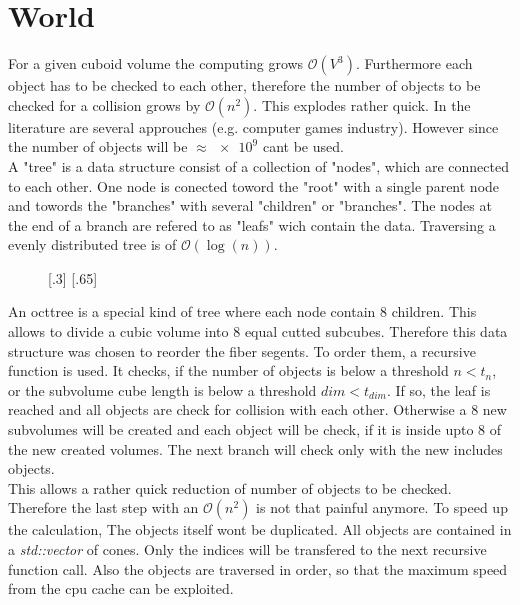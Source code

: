 \section{World}
For a given cuboid volume the computing grows $\mathcal{O}(V^3)$.
Furthermore each object has to be checked to each other, therefore the number of objects to be checked for a collision grows by $\mathcal{O}(n^2)$.
This explodes rather quick.
In the literature are several approuches (e.g. computer games industry).
However since the number of objects will be $\approx \num{e9}$ \dummy cant be used. \\
% 
A "tree" is a data structure consist of a collection of "nodes", which are connected to each other.
One node is conected toword the "root" with a single parent node and towords the "branches" with several "children" or "branches".
The nodes at the end of a branch are refered to as "leafs" wich contain the data.
Traversing a  evenly distributed tree is of $\mathcal{O}(\log(n))$.\\
% 
\begin{figure}[!t]
    \centering
    [.3\textwidth]{
    \def\tikzheight{0.6\textwidth}
    }
    [.65\textwidth]{
    \def\tikzheight{0.6\textwidth}
    }
	\caption{}
	\label{fig:oct_tree}
\end{figure}
% 
An octtree is a special kind of tree where each node contain 8 children.
This allows to divide a cubic volume into 8 equal cutted subcubes.
Therefore this data structure was chosen to reorder the fiber segents.
To order them, a recursive function is used.
It checks, if the number of objects is below a threshold $n < t_n$, or the subvolume cube length is below a threshold $dim < t_{dim}$.
If so, the leaf is reached and all objects are check for collision with each other.
Otherwise a 8 new subvolumes will be created and each object will be check, if it is inside upto 8 of the new created volumes.
The next branch will check only with the new includes objects. \\
% 
This allows a rather quick reduction of number of objects to be checked.
Therefore the last step with an $\mathcal{O}(n^2)$ is not that painful anymore.
To speed up the calculation, The objects itself wont be duplicated.
All objects are contained in a \textit{std::vector} of cones.
Only the indices will be transfered to the next recursive function call.
Also the objects are traversed in order, so that the maximum speed from the cpu cache can be exploited. \\

